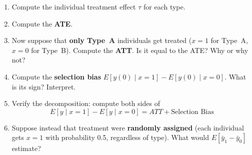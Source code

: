 \documentclass[11pt,a4paper]{article}
\begin{document}
\begin{enumerate}[label=(\alph*)]
\item Compute the individual treatment effect $\tau$ for each type.

\begin{answerbox}
\vspace{2.5cm}
\end{answerbox}

\item Compute the \textbf{ATE}.

\begin{answerbox}
\vspace{3cm}
\end{answerbox}

\item Now suppose that \textbf{only Type~A} individuals get treated ($x = 1$ for Type~A, $x = 0$ for Type~B). Compute the \textbf{ATT}. Is it equal to the ATE? Why or why not?

\begin{answerbox}
\vspace{3.5cm}
\end{answerbox}

\item Compute the \textbf{selection bias} $E[y(0) \mid x{=}1] - E[y(0) \mid x{=}0]$. What is its sign? Interpret.

\begin{answerbox}
\vspace{3.5cm}
\end{answerbox}

\newpage
\item Verify the decomposition: compute both sides of
\[
  E[y \mid x{=}1] - E[y \mid x{=}0] = ATT + \text{Selection Bias}
\]

\begin{answerbox}
\vspace{4cm}
\end{answerbox}

\item Suppose instead that treatment were \textbf{randomly assigned} (each individual gets $x=1$ with probability 0.5, regardless of type). What would $E[\bar{y}_1 - \bar{y}_0]$ estimate?

\begin{answerbox}
\vspace{3.5cm}
\end{answerbox}
\end{enumerate}

\end{document}

